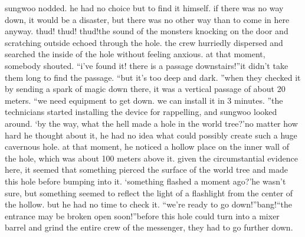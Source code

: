 sungwoo nodded.
 he had no choice but to find it himself.
if there was no way down, it would be a disaster, but there was no other way than to come in here anyway.
thud! thud! thud!the sound of the monsters knocking on the door and scratching outside echoed through the hole.
 the crew hurriedly dispersed and searched the inside of the hole without feeling anxious.
at that moment, somebody shouted.
“i’ve found it! there is a passage downstairs!”it didn’t take them long to find the passage.
“but it’s too deep and dark.
”when they checked it by sending a spark of magic down there, it was a vertical passage of about 20 meters.
“we need equipment to get down.
 we can install it in 3 minutes.
”the technicians started installing the device for rappelling, and sungwoo looked around.
‘by the way, what the hell made a hole in the world tree?’no matter how hard he thought about it, he had no idea what could possibly create such a huge cavernous hole.
at that moment, he noticed a hollow place on the inner wall of the hole, which was about 100 meters above it.
 given the circumstantial evidence here, it seemed that something pierced the surface of the world tree and made this hole before bumping into it.
‘something flashed a moment ago?’he wasn’t sure, but something seemed to reflect the light of a flashlight from the center of the hollow.
 but he had no time to check it.
“we’re ready to go down!”bang!“the entrance may be broken open soon!”before this hole could turn into a mixer barrel and grind the entire crew of the messenger, they had to go further down.


 